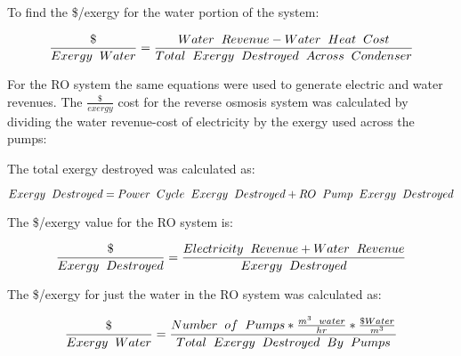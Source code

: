 To find the \$/exergy for the water portion of the system:

\begin{equation}
\frac{\$}{Exergy\hspace{.2cm}Water}=\frac{Water \hspace{.2cm} Revenue - Water \hspace{.2cm} Heat\hspace{.2cm}Cost}{Total\hspace{.2cm}Exergy\hspace{.2cm}Destroyed\hspace{.2cm}Across\hspace{.2cm}Condenser}
\end{equation}

For the RO system the same equations were used to generate electric and water revenues. The $\frac{\$}{exergy}$ cost for the reverse osmosis system was calculated by dividing the water revenue-cost of electricity by the exergy used across the pumps:

The total exergy destroyed was calculated as:

\begin{equation}
Exergy\hspace{.2cm}Destroyed = Power\hspace{.2cm}Cycle\hspace{.2cm}Exergy\hspace{.2cm}Destroyed+RO\hspace{.2cm}Pump\hspace{.2cm}Exergy\hspace{.2cm}Destroyed
\end{equation}

The \$/exergy value for the RO system is:

\begin{equation*}
\frac{\$}{Exergy\hspace{.2cm}Destroyed}=\frac{Electricity \hspace{.2cm} Revenue+ Water \hspace{.2cm} Revenue}{Exergy\hspace{.2cm}Destroyed}
\end{equation*}

The \$/exergy for just the water in the RO system was calculated as:

\begin{equation}
\frac{\$}{Exergy\hspace{.2cm}Water}=\frac{Number\hspace{.2cm} of \hspace{.2cm}Pumps*\frac{m^3 \hspace{.2cm}water}{hr}*\frac{\$Water}{m^3}}{Total\hspace{.2cm}Exergy\hspace{.2cm}Destroyed\hspace{.2cm}By\hspace{.2cm}Pumps}
\end{equation}


